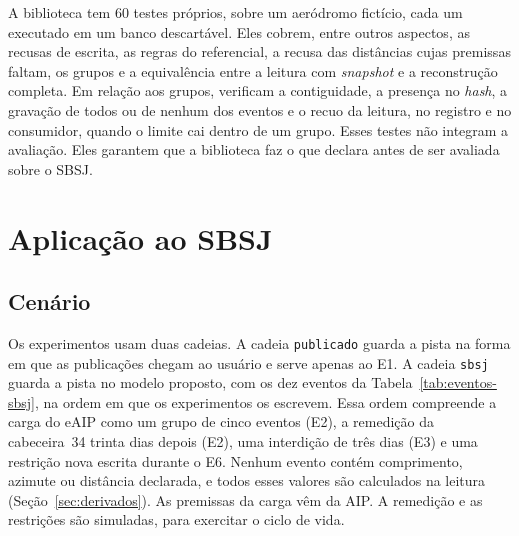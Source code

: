 A biblioteca tem 60 testes próprios, sobre um aeródromo fictício, cada um executado em um banco descartável. Eles cobrem, entre outros aspectos, as recusas de escrita, as regras do referencial, a recusa das distâncias cujas premissas faltam, os grupos e a equivalência entre a leitura com \textit{snapshot} e a reconstrução completa. Em relação aos grupos, verificam a contiguidade, a presença no \textit{hash}, a gravação de todos ou de nenhum dos eventos e o recuo da leitura, no registro e no consumidor, quando o limite cai dentro de um grupo. Esses testes não integram a avaliação. Eles garantem que a biblioteca faz o que declara antes de ser avaliada sobre o SBSJ.

\section{Aplicação ao SBSJ}\label{sec:aplicacao-sbsj}

\subsection{Cenário}

Os experimentos usam duas cadeias. A cadeia \texttt{publicado} guarda a pista na forma em que as publicações chegam ao usuário e serve apenas ao E1. A cadeia \texttt{sbsj} guarda a pista no modelo proposto, com os dez eventos da Tabela~\ref{tab:eventos-sbsj}, na ordem em que os experimentos os escrevem. Essa ordem compreende a carga do eAIP como um grupo de cinco eventos (E2), a remedição da cabeceira~34 trinta dias depois (E2), uma interdição de três dias (E3) e uma restrição nova escrita durante o E6. Nenhum evento contém comprimento, azimute ou distância declarada, e todos esses valores são calculados na leitura (Seção~\ref{sec:derivados}). As premissas da carga vêm da AIP. A remedição e as restrições são simuladas, para exercitar o ciclo de vida.

